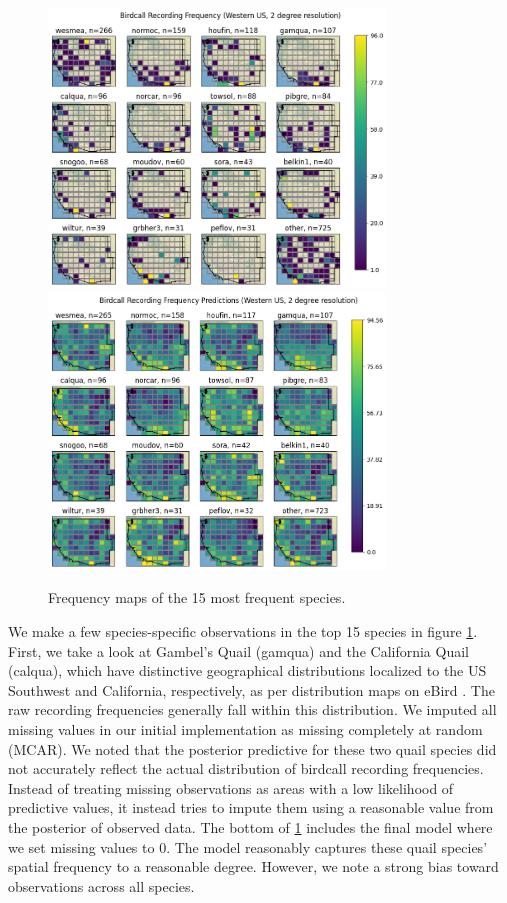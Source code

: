 \documentclass[notitlepage]{article}
\begin{document}
\begin{figure}[H]
\centering
\includegraphics[width=0.8\textwidth]{report/figures/western_us_raw_16.png}
\includegraphics[width=0.8\textwidth]{report/figures/western_us_predict_16.png}
\caption{Frequency maps of the 15 most frequent species.}
\label{fig:map_16}
\end{figure}

\clearpage

We make a few species-specific observations in the top 15 species in figure \ref{fig:map_16}.
First, we take a look at Gambel's Quail (gamqua) and the California Quail (calqua), which have distinctive geographical distributions localized to the US Southwest and California, respectively, as per distribution maps on eBird \cite{ebird_gamqua} \cite{ebird_calqua}.
The raw recording frequencies generally fall within this distribution.
We imputed all missing values in our initial implementation as missing completely at random (MCAR). 
We noted that the posterior predictive for these two quail species did not accurately reflect the actual distribution of birdcall recording frequencies.
Instead of treating missing observations as areas with a low likelihood of predictive values, it instead tries to impute them using a reasonable value from the posterior of observed data.
The bottom of \ref{fig:map_16} includes the final model where we set missing values to 0.
The model reasonably captures these quail species' spatial frequency to a reasonable degree.
However, we note a strong bias toward observations across all species.
\end{document}
